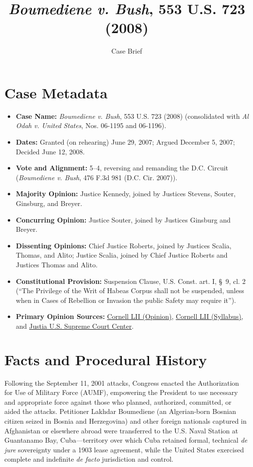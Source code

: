 \documentclass[12pt]{article}
\title{\textit{Boumediene v. Bush}, 553 U.S. 723 (2008)}
\author{Case Brief}
\date{}
\begin{document}
\maketitle

\section{Case Metadata}
\begin{itemize}
  \item \textbf{Case Name:} \textit{Boumediene v. Bush}, 553 U.S. 723 (2008) (consolidated with \textit{Al Odah v. United States}, Nos. 06-1195 and 06-1196).
  \item \textbf{Dates:} Granted (on rehearing) June 29, 2007; Argued December 5, 2007; Decided June 12, 2008.
  \item \textbf{Vote and Alignment:} 5--4, reversing and remanding the D.C. Circuit (\textit{Boumediene v. Bush}, 476 F.3d 981 (D.C. Cir. 2007)).
  \item \textbf{Majority Opinion:} Justice Kennedy, joined by Justices Stevens, Souter, Ginsburg, and Breyer.
  \item \textbf{Concurring Opinion:} Justice Souter, joined by Justices Ginsburg and Breyer.
  \item \textbf{Dissenting Opinions:} Chief Justice Roberts, joined by Justices Scalia, Thomas, and Alito; Justice Scalia, joined by Chief Justice Roberts and Justices Thomas and Alito.
  \item \textbf{Constitutional Provision:} Suspension Clause, U.S. Const. art. I, \S~9, cl. 2 (``The Privilege of the Writ of Habeas Corpus shall not be suspended, unless when in Cases of Rebellion or Invasion the public Safety may require it'').
  \item \textbf{Primary Opinion Sources:} \href{https://www.law.cornell.edu/supct/html/06-1195.ZO.html}{Cornell LII (Opinion)}, \href{https://www.law.cornell.edu/supct/html/06-1195.ZS.html}{Cornell LII (Syllabus)}, and \href{https://supreme.justia.com/cases/federal/us/553/723/}{Justia U.S. Supreme Court Center}.
\end{itemize}

\section{Facts and Procedural History}
Following the September 11, 2001 attacks, Congress enacted the Authorization for Use of Military Force (AUMF), empowering the President to use necessary and appropriate force against those who planned, authorized, committed, or aided the attacks. Petitioner Lakhdar Boumediene (an Algerian-born Bosnian citizen seized in Bosnia and Herzegovina) and other foreign nationals captured in Afghanistan or elsewhere abroad were transferred to the U.S. Naval Station at Guantanamo Bay, Cuba---territory over which Cuba retained formal, technical \textit{de jure} sovereignty under a 1903 lease agreement, while the United States exercised complete and indefinite \textit{de facto} jurisdiction and control.
\end{document}
